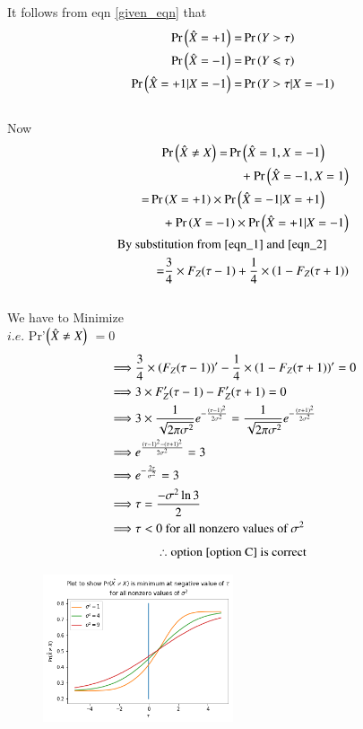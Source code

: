 \documentclass[journal,12pt,twocolumn]{IEEEtran}
\begin{document}
{%
It follows from eqn \eqref{given_eqn} that
\begin{align}
    \Pr\left(\hat{X}=+1\right)=&\Pr\left(Y>\tau\right)
    \\\Pr\left(\hat X =-1\right)=&\Pr\left(Y\leqslant\tau\right)
    \\ \Pr\left(\hat X =+1|X=-1\right)=&\Pr\left(Y>\tau|X=-1\right)
\end{align}
\\Now
\begin{align}
    \begin{split}
        \Pr\left(\hat X \neq X\right) =& \Pr\left(\hat X = 1,X=-1\right)
        \\ & \quad +  \Pr\left(\hat X = -1,X=1\right)
    \end{split}
        \\
    \begin{split}
         =&\Pr\left(X =+1\right)\times\Pr\left(\hat X=-1|X=+1\right) 
         \\&\quad+\Pr\left(X =-1\right)\times\Pr\left(\hat X=+1|X=-1\right)
    \end{split}
    \\
    \begin{split}
        \text{By substi}&\text{tution from \eqref{eqn_1} and \eqref{eqn_2}}
        \\=&\frac{3}{4} \times F_Z(\tau -1) + \frac{1}{4} \times \left(1-F_Z(\tau+1)\right)
    \end{split}
\end{align}
\\[2em]We have to Minimize 
\\$i.e.$ \;\; Pr'$\left(\hat X \neq X\right)$ $=0$
\begin{align}
    \implies & \frac{3}{4} \times \left(F_Z(\tau-1)\right)' - \frac{1}{4} \times \left(1-F_Z(\tau+1)\right)'=0
    \\ \implies & 3\times F'_Z(\tau-1) - F'_Z(\tau+1)=0
    \\\implies & 3\times\frac{1}{\sqrt{2\pi\sigma^2}}e^{-\frac{\left(\tau-1\right)^2}{2\sigma^2}}=\frac{1}{\sqrt{2\pi\sigma^2}}e^{-\frac{\left(\tau+1\right)^2}{2\sigma^2}}
    \\\implies & e^{\frac{\left(\tau-1\right)^2-\left(\tau +1\right)^2}{2\sigma^2}}=3 
    \\ \implies & e^{-\frac{2\tau}{\sigma^2}}=3
    \\ \implies & \tau = \frac{-\sigma^2\ln{3}}{2}
    \\ \implies & \tau < 0 \text{  for all nonzero values of $\sigma^2$}
\end{align}
\[\therefore \text{option \ref{option C} is correct}\]
}%
\newpage
\begin{figure}[h!]
    \centering
    \includegraphics[width=0.5\textwidth]{fig-simulation}
    \label{fig:my_label}
\end{figure}
\end{document}
